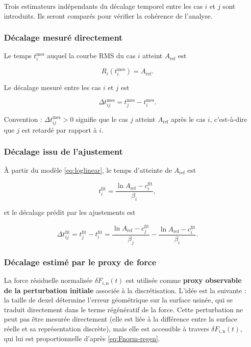 \documentclass[11pt,a4paper]{article}
\newcommand{\dFin}{\delta F_{i,\mathrm{n}}}    %
\newcommand{\betai}{\beta_i}                   %
\newcommand{\cfit}{c_i^{\mathrm{fit}}}         %
\newcommand{\Aref}{A_{\mathrm{ref}}}           %
\newcommand{\tmes}{t_i^{\mathrm{mes}}}         %
\newcommand{\tfit}{t_i^{\mathrm{fit}}}         %
\newcommand{\Dtmes}{\Delta t_{ij}^{\mathrm{mes}}}
\newcommand{\Dtfit}{\Delta t_{ij}^{\mathrm{fit}}}
\begin{document}
Trois estimateurs indépendants du décalage temporel entre les cas \(i\) et
\(j\) sont introduits. Ils seront comparés pour vérifier la cohérence de
l'analyse.

\subsubsection{Décalage mesuré directement}

Le temps \(\tmes\) auquel la courbe RMS du cas \(i\) atteint \(\Aref\) est

\begin{equation}
    R_i\!\left(\tmes\right) = \Aref.
    \label{eq:tmes-def}
\end{equation}

Le décalage mesuré entre les cas \(i\) et \(j\) est

\begin{equation}
    \Dtmes = t_j^{\mathrm{mes}} - \tmes.
    \label{eq:Dtmes}
\end{equation}

Convention : \(\Dtmes > 0\) signifie que le cas \(j\) atteint \(\Aref\) après
le cas \(i\), c'est-à-dire que \(j\) est retardé par rapport à \(i\).

\subsubsection{Décalage issu de l'ajustement}

À partir du modèle \ref{eq:loglinear}, le temps d'atteinte de \(\Aref\) est

\begin{equation}
    \tfit = \frac{\ln\Aref - \cfit}{\betai},
    \label{eq:tfit}
\end{equation}

et le décalage prédit par les ajustements est

\begin{equation}
    \Dtfit = t_j^{\mathrm{fit}} - \tfit
    =
    \frac{\ln\Aref - c_j^{\mathrm{fit}}}{\beta_j}
    -
    \frac{\ln\Aref - \cfit}{\betai}.
    \label{eq:Dtfit-general}
\end{equation}

\subsubsection{Décalage estimé par le proxy de force}
\label{subsec:proxy}

La force résiduelle normalisée \(\dFin(t)\) est utilisée comme
\textbf{proxy observable de la perturbation initiale} associée à la
discrétisation. L'idée est la suivante : la taille de dexel détermine l'erreur
géométrique sur la surface usinée, qui se traduit directement dans le terme
régénératif de la force. Cette perturbation ne peut pas être mesurée
directement (elle est liée à la différence entre la surface réelle et sa
représentation discrète), mais elle est accessible à travers \(\dFin(t)\), qui
lui est proportionnelle d'après \ref{eq:Fnorm-regen}.
\end{document}
